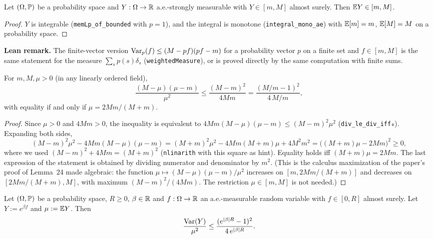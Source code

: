 \begin{lemma}\label{lem:pana_integral_mem_Icc}
\leanok
Let $(\Omega, \mathbb{P})$ be a probability space and $Y : \Omega \to \mathbb{R}$ a.e.-strongly measurable
with $Y \in [m, M]$ almost surely. Then $\mathbb{E} Y \in [m, M]$.
\end{lemma}

\begin{proof}
\leanok
$Y$ is integrable (\texttt{memLp\_of\_bounded} with $p = 1$), and the integral is monotone
(\texttt{integral\_mono\_ae}) with $\mathbb{E}[m] = m$, $\mathbb{E}[M] = M$ on a probability space.
\end{proof}

\textbf{Lean remark.} The finite-vector version $\operatorname{Var}_p(f) \le (M - pf)(pf - m)$ for a
probability vector $p$ on a finite set and $f \in [m, M]$ is the same statement for the measure
$\sum_s p(s)\delta_s$ (\texttt{weightedMeasure}), or is proved directly by the same computation
with finite sums.

\begin{lemma}\label{lem:pana_var_ratio_max}
\leanok
For $m, M, \mu > 0$ (in any linearly ordered field),
\[
  \frac{(M - \mu)(\mu - m)}{\mu^2} \le \frac{(M - m)^2}{4Mm}
  = \frac{(M/m - 1)^2}{4\,M/m},
\]
with equality if and only if $\mu = 2Mm/(M + m)$.
\end{lemma}

\begin{proof}
\leanok
Since $\mu > 0$ and $4Mm > 0$, the inequality is equivalent to
$4Mm(M - \mu)(\mu - m) \le (M - m)^2\mu^2$ (\texttt{div\_le\_div\_iff₀}). Expanding both sides,
\[
  (M - m)^2\mu^2 - 4Mm(M - \mu)(\mu - m)
  = (M + m)^2\mu^2 - 4Mm(M + m)\mu + 4M^2m^2
  = \big((M + m)\mu - 2Mm\big)^2 \ge 0 ,
\]
where we used $(M - m)^2 + 4Mm = (M + m)^2$ (\texttt{nlinarith} with this square as hint).
Equality holds iff $(M + m)\mu = 2Mm$. The last
expression of the statement is obtained by dividing numerator and denominator by $m^2$.
(This is the calculus maximization of the paper's proof of Lemma~24 made algebraic: the
function $\mu \mapsto (M - \mu)(\mu - m)/\mu^2$ increases on $[m, 2Mm/(M + m)]$ and decreases
on $[2Mm/(M + m), M]$, with maximum $(M - m)^2/(4Mm)$. The restriction $\mu \in [m, M]$ is not
needed.)
\end{proof}

\begin{lemma}\label{lem:normalized_variance_bound}
\leanok
Let $(\Omega, \mathbb{P})$ be a probability space, $R \ge 0$, $\beta \in \mathbb{R}$ and $f : \Omega \to \mathbb{R}$
an a.e.-measurable random variable with $f \in [0, R]$ almost surely. Let $Y := e^{\beta f}$
and $\mu := \mathbb{E} Y$. Then
\[
  \frac{\operatorname{Var}(Y)}{\mu^2} \le \frac{(e^{\lvert \beta \rvert R} - 1)^2}{4\,e^{\lvert \beta \rvert R}} .
\]
\end{lemma}

